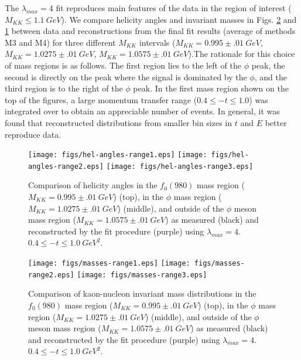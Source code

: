 \documentclass[twocolumn,superscriptaddress,prd]{revtex4}
\begin{document}
The $\lambda_{max}=4$ fit reproduces main features of the data in the region of interest ($M_{KK} \le 1.1 \ GeV$). We compare helicity angles and invariant masses in Figs. \ref{fig:mass} and  \ref{fig:angles} between data and reconstructions from the final fit results (average of methods M3 and M4) for three different $M_{KK}$ intervals ($M_{KK} = 0.995 \pm .01 \ GeV$, $M_{KK} = 1.0275 \pm .01 \ GeV$, $M_{KK} = 1.0575 \pm .01 \ GeV$).The rationale for this choice of mass regions is as follows. The first region lies to the left of the $\phi$ peak, the second is directly on the peak where the signal is dominated by the $\phi$, and the third region is to the right of the $\phi$ peak.  In the first mass region shown on the top of the figures, a large momentum transfer range ($0.4  \le -t \le 1.0$) was integrated over to obtain an appreciable number of events. In general, it was found that reconstructed distributions from smaller bin sizes in $t$ and $E$ better reproduce data. 
\begin{figure}
\texttt{[image: figs/hel-angles-range1.eps]}
\texttt{[image: figs/hel-angles-range2.eps]}
\texttt{[image: figs/hel-angles-range3.eps]}
\caption{Comparison of helicity angles in the $f_0(980)$ mass region ($M_{KK} = 0.995 \pm .01 \ GeV$) (top),  in the $\phi$ mass region ($M_{KK} = 1.0275 \pm .01 \ GeV$) (middle),  and outside of the $\phi$ meson mass region ($M_{KK} = 1.0575 \pm .01 \ GeV$) as measured (black) and reconstructed by the fit procedure (purple) using $\lambda_{max}=4$. $0.4 \le -t \le 1.0 \ GeV^2$.}
\label{fig:angles}
\end{figure}
\begin{figure}
\texttt{[image: figs/masses-range1.eps]}
\texttt{[image: figs/masses-range2.eps]}
\texttt{[image: figs/masses-range3.eps]}
\caption{Comparison of kaon-nucleon invariant mass distributions in the $f_0(980)$ mass region ($M_{KK} = 0.995 \pm .01 \ GeV$) (top),  in the $\phi$ mass region ($M_{KK} = 1.0275 \pm .01 \ GeV$) (middle),  and outside of the $\phi$ meson mass region ($M_{KK} = 1.0575 \pm .01 \ GeV$) as measured (black) and reconstructed by the fit procedure (purple) using $\lambda_{max}=4$. $0.4 \le -t \le 1.0 \ GeV^2$.}
\label{fig:mass}
\end{figure}
\end{document}
